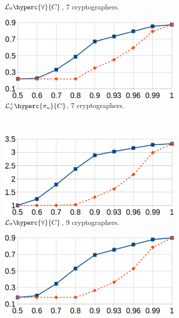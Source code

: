 \begin{figure}[ht]
\begin{subfigure}[b]{0.45\linewidth}
\caption{$\mathcal{L}_\forall\hyperc{\forall}{C}$, 7 cryptographers.}
\end{subfigure}
\hfill
\centering
\begin{subfigure}[b]{0.45\linewidth}
\includegraphics[width=\textwidth]{figures/dining-add-7.png}
\caption{$\mathcal{L}^+_\forall\hyperc{\pi_u}{C}$, 7 cryptographers.}
\end{subfigure}
\\ \vspace{3mm}
\begin{subfigure}[b]{0.45\linewidth}
\includegraphics[width=\textwidth]{figures/dining-mult-9.png}
\caption{$\mathcal{L}_\forall\hyperc{\forall}{C}$, 9 cryptographers.}
\end{subfigure}
\hfill
\centering
\begin{subfigure}[b]{0.45\linewidth}
\includegraphics[width=\textwidth]{figures/dining-add-9.png}

\end{subfigure}
\end{figure}
